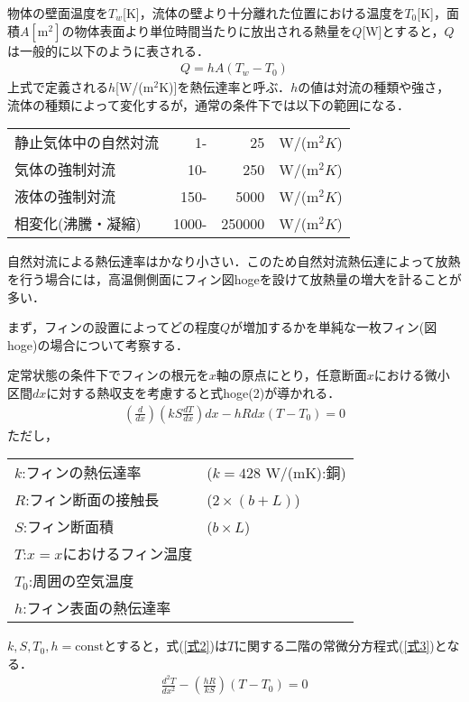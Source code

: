 \documentclass[a4paper,11pt,uplatex]{jsarticle}
\begin{document}
\par
物体の壁面温度を$T_w$[K]，流体の壁より十分離れた位置における温度を$T_0$[K]，面積$A[\mathrm{m^2}]$の物体表面より単位時間当たりに放出される熱量を$Q$[W]とすると，$Q$は一般的に以下のように表される．
\begin{align}
  Q=hA(T_w-T_0)
\end{align}
上式で定義される$h$[W/($\mathrm{m^2}$K)]を熱伝達率と呼ぶ．$h$の値は対流の種類や強さ，流体の種類によって変化するが，通常の条件下では以下の範囲になる．
\begin{table}[H]
\begin{tabular}{lrrl}
静止気体中の自然対流 & 1-    & 25     &  W/($\mathrm{m^2}K$)\\
気体の強制対流    & 10-   & 250    &  W/($\mathrm{m^2}K$)\\
液体の強制対流    & 150-  & 5000   &  W/($\mathrm{m^2}K$)\\
相変化(沸騰・凝縮) & 1000- & 250000 & W/($\mathrm{m^2}K$)
\end{tabular}
\end{table}
自然対流による熱伝達率はかなり小さい．このため自然対流熱伝達によって放熱を行う場合には，高温側側面にフィン図hogeを設けて放熱量の増大を計ることが多い．
\par
まず，フィンの設置によってどの程度$Q$が増加するかを単純な一枚フィン(図hoge)の場合について考察する．
\par
定常状態の条件下でフィンの根元を$x$軸の原点にとり，任意断面$x$における微小区間$dx$に対する熱収支を考慮すると式hoge(2)が導かれる．
\begin{align}
  \label{式2}
  \left( \frac{d}{dx}\right) \left(kS \frac{dT}{dx}\right)dx - hRdx(T-T_0)=0
\end{align}
ただし，
\begin{table}[H]
\begin{tabular}{ll}
$k$:フィンの熱伝達率 & ($k = 428$ W/(mK):銅) \\
$R$:フィン断面の接触長 & ($2 \times (b+L)$) \\
$S$:フィン断面積 & ($b \times L$) \\
$T$:$x=x$におけるフィン温度 & \\
$T_0$:周囲の空気温度 & \\
$h$:フィン表面の熱伝達率 &
\end{tabular}
\end{table}
$k,S,T_0,h=\mathrm{const}$とすると，式(\ref{式2})は$T$に関する二階の常微分方程式(\ref{式3})となる．
\begin{align}
  \label{式3}
  \frac{d^2T}{dx^2} - \left(\frac{hR}{kS}\right)(T-T_0)=0
\end{align}
\end{document}
